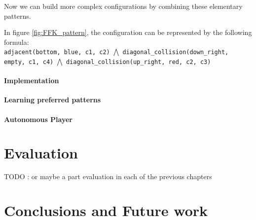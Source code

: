 \documentclass[12pt,twoside]{report}
\begin{document}




\bigskip

Now we can build more complex configurations by combining these elementary patterns.

\begin{example}
In figure \ref{fig:FFK_pattern}, the configuration can be represented by the following formula:\\
\texttt{adjacent(bottom, blue, c1, c2)} $\bigwedge$ \texttt{diagonal\_collision(down\_right, empty, c1, c4)} $\bigwedge$ \texttt{diagonal\_collision(up\_right, red, c2, c3)}
\end{example}


\subsubsection{Implementation}


\subsubsection{Learning preferred patterns}





\subsubsection{Autonomous Player}


\chapter{Evaluation}

TODO : or maybe a part evaluation in each of the previous chapters

\chapter{Conclusions and Future work}
\end{document}
